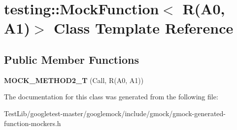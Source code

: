 \hypertarget{classtesting_1_1MockFunction_3_01R_07A0_00_01A1_08_4}{}\section{testing\+:\+:Mock\+Function$<$ R(A0, A1)$>$ Class Template Reference}
\label{classtesting_1_1MockFunction_3_01R_07A0_00_01A1_08_4}
\subsection*{Public Member Functions}
\begin{DoxyCompactItemize}
\item 
\mbox{\label{classtesting_1_1MockFunction_3_01R_07A0_00_01A1_08_4_a5a4d673a3252cab866f0a4fa97486190}} 
{\bfseries M\+O\+C\+K\+\_\+\+M\+E\+T\+H\+O\+D2\+\_\+T} (Call, R(A0, A1))
\end{DoxyCompactItemize}


The documentation for this class was generated from the following file\+:\begin{DoxyCompactItemize}
\item 
Test\+Lib/googletest-\/master/googlemock/include/gmock/gmock-\/generated-\/function-\/mockers.\+h\end{DoxyCompactItemize}
